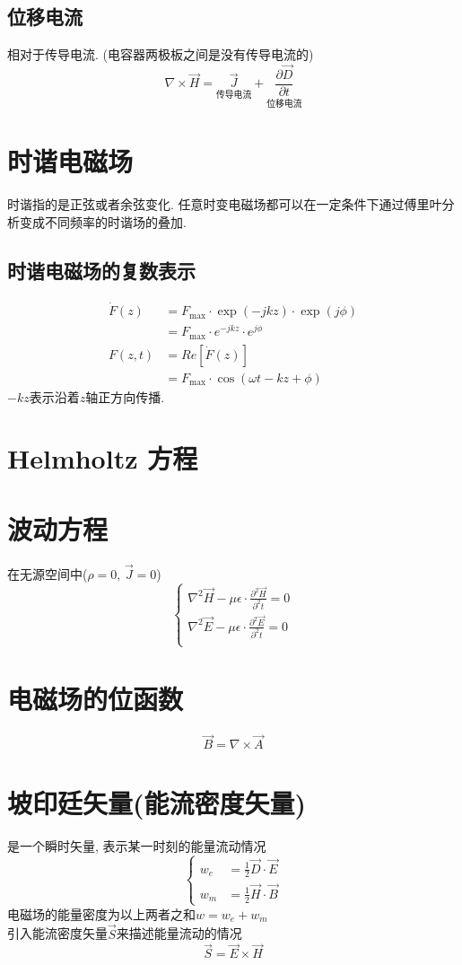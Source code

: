 \documentclass[a4paper]{report}
\begin{document}
\subsection{位移电流}
相对于传导电流. (电容器两极板之间是没有传导电流的)
$$\nabla\times \vec{H} =\underset{\text{传导电流}}{\vec{J}} + \underset{\text{位移电流}}{\frac{\partial \vec{D} }{\partial t}} $$

\section{时谐电磁场}
时谐指的是正弦或者余弦变化. 任意时变电磁场都可以在一定条件下通过傅里叶分析变成不同频率的时谐场的叠加. 
\subsection{时谐电磁场的复数表示}
\begin{align*}
    \dot{F}(z)&=F_{\text{max}}\cdot \exp(-jkz)\cdot\exp(j\phi)\\
    &=F_{\text{max}}\cdot e^{-jkz}\cdot e^{j\phi}\\
    F(z,t)&=Re[\dot{F}(z)]\\
    &=F_{\text{max}}\cdot \cos(\omega t-kz+\phi)
\end{align*}
$-kz$表示沿着$z$轴正方向传播. 
\section{Helmholtz 方程}
\section{波动方程}
在无源空间中($\rho=0\text{, }\vec{J}=0$)
$$\begin{cases}
    \nabla^2 \vec{H}-\mu\epsilon\cdot \frac{\partial^2 \vec{H} }{\partial^2 t} =0\\
    \nabla^2 \vec{E}-\mu\epsilon\cdot \frac{\partial^2 \vec{E} }{\partial^2 t} =0\\
\end{cases}$$

\section{电磁场的位函数}
$$\vec{B}=\nabla\times \vec{A}$$
\section{坡印廷矢量(能流密度矢量)}
\label{sec:poynting}
是一个瞬时矢量, 表示某一时刻的能量流动情况
$$\begin{cases}
    w_e&=\frac{1}{2} \vec{D}\cdot\vec{E}\\
    w_m&=\frac{1}{2}\vec{H}\cdot\vec{B}
\end{cases}$$
电磁场的能量密度为以上两者之和$w=w_e+w_m$\\
引入能流密度矢量$\vec{S}$来描述能量流动的情况
$$\vec{S}=\vec{E}\times \vec{H}  $$
\end{document}
